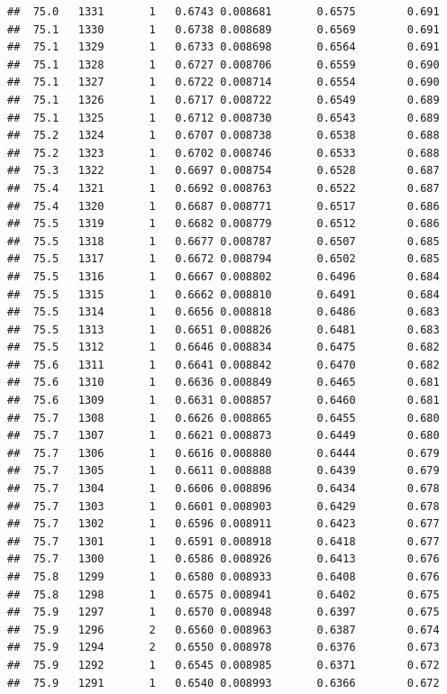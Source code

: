 \documentclass[
]{book}
\begin{document}
\begin{verbatim}
##  75.0   1331       1   0.6743 0.008681       0.6575        0.691
##  75.1   1330       1   0.6738 0.008689       0.6569        0.691
##  75.1   1329       1   0.6733 0.008698       0.6564        0.691
##  75.1   1328       1   0.6727 0.008706       0.6559        0.690
##  75.1   1327       1   0.6722 0.008714       0.6554        0.690
##  75.1   1326       1   0.6717 0.008722       0.6549        0.689
##  75.1   1325       1   0.6712 0.008730       0.6543        0.689
##  75.2   1324       1   0.6707 0.008738       0.6538        0.688
##  75.2   1323       1   0.6702 0.008746       0.6533        0.688
##  75.3   1322       1   0.6697 0.008754       0.6528        0.687
##  75.4   1321       1   0.6692 0.008763       0.6522        0.687
##  75.4   1320       1   0.6687 0.008771       0.6517        0.686
##  75.5   1319       1   0.6682 0.008779       0.6512        0.686
##  75.5   1318       1   0.6677 0.008787       0.6507        0.685
##  75.5   1317       1   0.6672 0.008794       0.6502        0.685
##  75.5   1316       1   0.6667 0.008802       0.6496        0.684
##  75.5   1315       1   0.6662 0.008810       0.6491        0.684
##  75.5   1314       1   0.6656 0.008818       0.6486        0.683
##  75.5   1313       1   0.6651 0.008826       0.6481        0.683
##  75.5   1312       1   0.6646 0.008834       0.6475        0.682
##  75.6   1311       1   0.6641 0.008842       0.6470        0.682
##  75.6   1310       1   0.6636 0.008849       0.6465        0.681
##  75.6   1309       1   0.6631 0.008857       0.6460        0.681
##  75.7   1308       1   0.6626 0.008865       0.6455        0.680
##  75.7   1307       1   0.6621 0.008873       0.6449        0.680
##  75.7   1306       1   0.6616 0.008880       0.6444        0.679
##  75.7   1305       1   0.6611 0.008888       0.6439        0.679
##  75.7   1304       1   0.6606 0.008896       0.6434        0.678
##  75.7   1303       1   0.6601 0.008903       0.6429        0.678
##  75.7   1302       1   0.6596 0.008911       0.6423        0.677
##  75.7   1301       1   0.6591 0.008918       0.6418        0.677
##  75.7   1300       1   0.6586 0.008926       0.6413        0.676
##  75.8   1299       1   0.6580 0.008933       0.6408        0.676
##  75.8   1298       1   0.6575 0.008941       0.6402        0.675
##  75.9   1297       1   0.6570 0.008948       0.6397        0.675
##  75.9   1296       2   0.6560 0.008963       0.6387        0.674
##  75.9   1294       2   0.6550 0.008978       0.6376        0.673
##  75.9   1292       1   0.6545 0.008985       0.6371        0.672
##  75.9   1291       1   0.6540 0.008993       0.6366        0.672

\end{verbatim}
\end{document}
